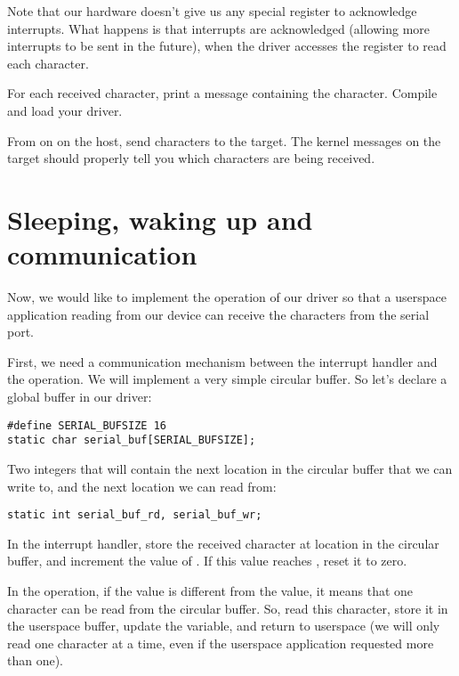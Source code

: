 Note that our hardware doesn't give us any special register to
acknowledge interrupts. What happens is that interrupts are
acknowledged (allowing more interrupts to be sent in the future), when
the driver accesses the  register to read each
character.

For each received character, print a message containing the character.
Compile and load your driver.

From  on  on the host, send characters
to the target. The kernel messages on the target should properly tell
you which characters are being received.

\section{Sleeping, waking up and communication}

Now, we would like to implement the  operation of our
driver so that a userspace application reading from our device can
receive the characters from the serial port.

First, we need a communication mechanism between the interrupt handler
and the  operation. We will implement a very simple
circular buffer. So let's declare a global buffer in our driver:

\begin{verbatim}
#define SERIAL_BUFSIZE 16
static char serial_buf[SERIAL_BUFSIZE];
\end{verbatim}

Two integers that will contain the next location in the circular
buffer that we can write to, and the next location we can read from:

\begin{verbatim}
static int serial_buf_rd, serial_buf_wr;
\end{verbatim}

In the interrupt handler, store the received character at location
 in the circular buffer, and increment the value
of . If this value reaches ,
reset it to zero.

In the  operation, if the  value is
different from the  value, it means that one
character can be read from the circular buffer. So, read this
character, store it in the userspace buffer, update the
 variable, and return to userspace (we will only
read one character at a time, even if the userspace application
requested more than one).

